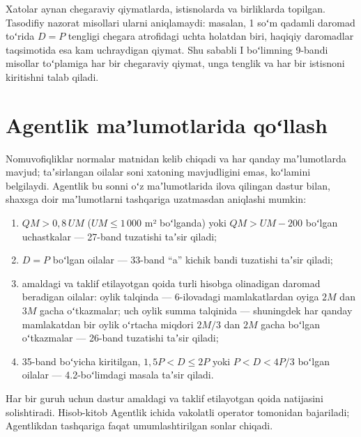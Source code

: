 \documentclass[12pt,a4paper]{extarticle}
\begin{document}
Xatolar aynan chegaraviy qiymatlarda, istisnolarda va birliklarda topilgan. Tasodifiy nazorat misollari ularni aniqlamaydi: masalan, 1 soʻm qadamli daromad toʻrida $D=P$ tengligi chegara atrofidagi uchta holatdan biri, haqiqiy daromadlar taqsimotida esa kam uchraydigan qiymat. Shu sababli I boʻlimning 9-bandi misollar toʻplamiga har bir chegaraviy qiymat, unga tenglik va har bir istisnoni kiritishni talab qiladi.

\section{Agentlik maʼlumotlarida qoʻllash}\label{sec:agency}
Nomuvofiqliklar normalar matnidan kelib chiqadi va har qanday maʼlumotlarda mavjud; taʼsirlangan oilalar soni xatoning mavjudligini emas, koʻlamini belgilaydi. Agentlik bu sonni oʻz maʼlumotlarida ilova qilingan dastur bilan, shaxsga doir maʼlumotlarni tashqariga uzatmasdan aniqlashi mumkin:
\begin{enumerate}[leftmargin=1.27cm]
\item $QM>0{,}8\,UM$ ($UM\le1\,000$ m² boʻlganda) yoki $QM>UM-200$ boʻlgan uchastkalar — 27-band tuzatishi taʼsir qiladi;
\item $D=P$ boʻlgan oilalar — 33-band “a” kichik bandi tuzatishi taʼsir qiladi;
\item amaldagi va taklif etilayotgan qoida turli hisobga olinadigan daromad beradigan oilalar: oylik talqinda — 6-ilovadagi mamlakatlardan oyiga $2M$ dan $3M$ gacha oʻtkazmalar; uch oylik summa talqinida — shuningdek har qanday mamlakatdan bir oylik oʻrtacha miqdori $2M/3$ dan $2M$ gacha boʻlgan oʻtkazmalar — 26-band tuzatishi taʼsir qiladi;
\item 35-band boʻyicha kiritilgan, $1{,}5P<D\le2P$ yoki $P<D<4P/3$ boʻlgan oilalar — 4.2-boʻlimdagi masala taʼsir qiladi.
\end{enumerate}
Har bir guruh uchun dastur amaldagi va taklif etilayotgan qoida natijasini solishtiradi. Hisob-kitob Agentlik ichida vakolatli operator tomonidan bajariladi; Agentlikdan tashqariga faqat umumlashtirilgan sonlar chiqadi.
\end{document}
